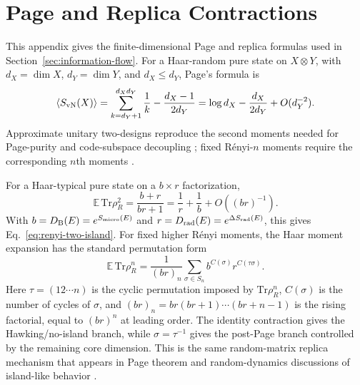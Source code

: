 \documentclass[12pt]{article}
\newcommand{\Tr}{\mathrm{Tr}}
\newcommand{\E}{\mathbb E}
\newcommand{\Smicro}{S_{\rm micro}}
\begin{document}
\section{Page and Replica Contractions}
\label{app:page-replica}

This appendix gives the finite-dimensional Page and replica formulas used in
Section~\ref{sec:information-flow}.  For a Haar-random pure state on
$X\otimes Y$, with
$d_X=\dim X$, $d_Y=\dim Y$, and $d_X\le d_Y$, Page's formula is
\begin{equation}
    \langle S_{\rm vN}(X)\rangle
    =
    \sum_{k=d_Y+1}^{d_Xd_Y}\frac1k
    -
    \frac{d_X-1}{2d_Y}
    =
    \log d_X-\frac{d_X}{2d_Y}+O(d_Y^{-2}).
\end{equation}
Approximate unitary two-designs reproduce the second moments needed for
Page-purity and code-subspace decoupling
\cite{DankertCleveEmersonLivine2009,SzehrDupuisTomamichelRenner2013};
fixed R\'enyi-$n$ moments require the corresponding $n$th moments
\cite{HarrowLow2009}.

For a Haar-typical pure state on a $b\times r$ factorization,
\begin{equation}
    \E\,\Tr\rho_R^2
    =
    \frac{b+r}{br+1}
    =
    \frac1r+\frac1b+O((br)^{-1}).
\end{equation}
With
$b=D_{\rm B}(E)=e^{\Smicro(E)}$ and
$r=D_{\rm rad}(E)=e^{\Delta S_{\rm rad}(E)}$, this gives
Eq.~\eqref{eq:renyi-two-island}.  For fixed higher R\'enyi moments, the Haar
moment expansion has the standard permutation form
\begin{equation}\label{eq:renyi-n-perm}
    \E\,\Tr\rho_R^n
    =
    \frac{1}{(br)_n}
    \sum_{\sigma\in S_n}
    b^{C(\sigma)}r^{C(\tau\sigma)}.
\end{equation}
Here $\tau=(12\cdots n)$ is the cyclic permutation imposed by
$\Tr\rho_R^n$, $C(\sigma)$ is the number of cycles of $\sigma$, and
$(br)_n=br(br+1)\cdots(br+n-1)$ is the rising factorial, equal to $(br)^n$
at leading order.  The
identity contraction gives the Hawking/no-island branch, while
$\sigma=\tau^{-1}$ gives the post-Page branch controlled by the remaining core
dimension.  This is the same random-matrix replica mechanism that appears in
Page theorem and random-dynamics discussions of island-like behavior
\cite{Urbach2021,deBoerHollanderRolph2024,BasuWenZhou2025}.
\end{document}
